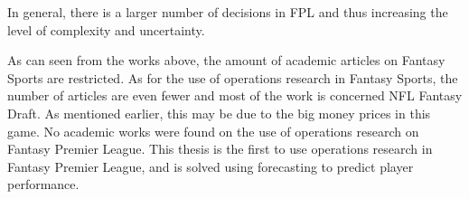 In general, there is a larger number of decisions in FPL and thus increasing the level of complexity and uncertainty. 

\newpar

As can seen from the works above, the amount of academic articles on Fantasy Sports are restricted. As for the use of operations research in Fantasy Sports, the number of articles are even fewer and most of the work is concerned NFL Fantasy Draft. As mentioned earlier, this may be due to the big money prices in this game. No academic works were found on the use of operations research on Fantasy Premier League. This thesis is the first to use operations research in Fantasy Premier League, and is solved using forecasting to predict player performance. 

\begin{comment}
- på samme måte at man har en budget limit finnes det også budget constraints i portfolio. 
- i portfolio kan man investere fraksjoner i assets, mens i ftcp er valgene binary, enten er spilleren med på laget eller ikke. 
- en forskjell er også at i ftcp har man en limit på hvor mange spillere man skal ha totalt, men også en grense på antall spillere i forskjellige roller, mens i portfolje er vanligvis asset classes ikke gitt på forhånd. 
- risk er et viktig og vanlig aspekt i portfølge optimeringen
- skrive om daily fantasy sports artikkelen 
\end{comment}



